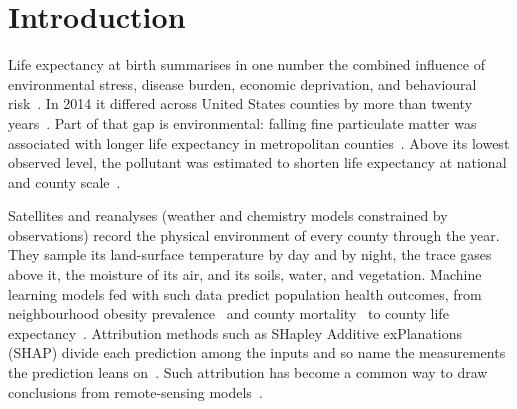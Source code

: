 \documentclass[sensors,article,submit,moreauthors,pdftex]{Definitions/mdpi}
\begin{document}
\section{Introduction}
\label{sec:intro}

Life expectancy at birth summarises in one number the combined influence of
environmental stress, disease burden, economic deprivation, and behavioural
risk~\cite{Murray2013, Chetty2016}. In 2014 it differed across United States counties by
more than twenty years~\cite{DwyerLindgren2017}. Part of that gap is
environmental: falling fine particulate matter was associated with longer life
expectancy in metropolitan counties~\cite{Pope2009}. Above its lowest
observed level, the pollutant was estimated to shorten life expectancy at
national and county scale~\cite{Bennett2019}.

Satellites and reanalyses (weather and chemistry models constrained by
observations) record the physical environment of every county through the year. They
sample its land-surface temperature by day and by night, the trace gases above
it, the moisture of its air, and its soils, water, and vegetation. Machine
learning models fed with such data predict population health outcomes, from neighbourhood obesity prevalence~\cite{Maharana2018} and
county mortality~\cite{Levy2021} to county life
expectancy~\cite{Ruwali2026multi, Ahmad2026night}. Attribution methods such as
SHapley Additive exPlanations (SHAP) divide each
prediction among the inputs and so name the measurements the prediction leans
on~\cite{Lundberg2017, Lundberg2020}. Such attribution has become a common way
to draw conclusions from remote-sensing models~\cite{Hohl2024}.
\end{document}

